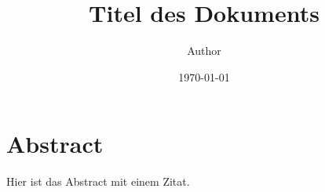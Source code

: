 \documentclass[a4paper]{article}
\title{Titel des Dokuments}
\author{Author}
\date{\today}
\begin{document}
\maketitle
\pagebreak
\tableofcontents
\pagebreak

\section{Abstract}
Hier ist das Abstract mit einem Zitat\cite[p.~150]{quellenName}.

\pagebreak


    
\end{document}
